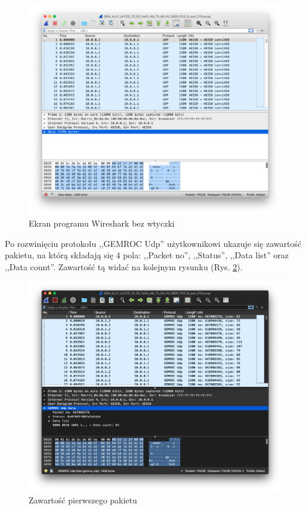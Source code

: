 \documentclass[a4paper, 12pt, twoside, openright]{article}
\begin{document}
	\begin{figure}[h]
		\centering
			\includegraphics[width=1.0\textwidth]{img/screenshot_no_dissector.png}
		\caption{Ekran programu Wireshark bez wtyczki}
		\label{fig:no_dis}
	\end{figure}


Po rozwinięciu protokołu ,,GEMROC Udp'' użytkownikowi ukazuje się zawartość pakietu, na którą
składają się 4 pola: ,,Packet no'', ,,Status'', ,,Data list'' oraz ,,Data count''.
Zawartość tą widać na kolejnym rysunku (Rys. \ref{fig:dis_pack}).

	\begin{figure}[h]
		\centering
			\includegraphics[width=1.0\textwidth]{img/screenshot_dissector_list.png}
		\caption{Zawartość pierwszego pakietu}
		\label{fig:dis_pack}
	\end{figure}
\end{document}
